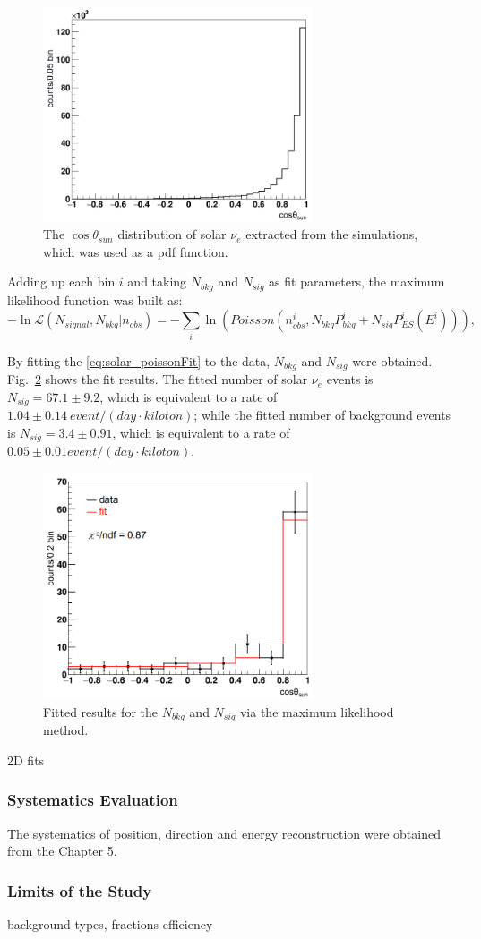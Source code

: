 \begin{figure}[!htb]
	\centering
	\includegraphics[width=8cm]{solarPDF.png}
	\caption{The $\cos\theta_{sun}$ distribution of solar $\nu_e$ extracted from the simulations, which was used as a pdf function.}
	\label{solarPDF}
\end{figure}

Adding up each bin $i$ and taking $N_{bkg}$ and $N_{sig}$ as fit parameters, the maximum likelihood function was built as:
\begin{equation}\label{eq:solar_poissonFit}
-\ln\mathcal L(N_{signal},N_{bkg}|n_{obs})
=-\sum_i\ln(Poisson(n^i_{obs}, N_{bkg}P^i_{bkg}+N_{sig}P^i_{ES}(E^i))),
\end{equation}

By fitting the \ref{eq:solar_poissonFit} to the data, $N_{bkg}$ and $N_{sig}$ were obtained.
Fig.~\ref{solarFits1} shows the fit results. The fitted number of solar $\nu_e$ events is $N_{sig} = 67.1\pm9.2$, which is equivalent to a rate of $1.04\pm 0.14~event/(day\cdot kiloton)$; while the fitted number of background events is $N_{sig} = 3.4\pm0.91$, which is equivalent to a rate of $0.05\pm 0.01 event/(day\cdot kiloton)$.

\begin{figure}[!htb]
	\centering
	\includegraphics[width=8cm]{solarFits1.png}
	\caption{Fitted results for the $N_{bkg}$ and $N_{sig}$ via the maximum likelihood method.}
	\label{solarFits1}
\end{figure}

2D fits



\subsubsection{Systematics Evaluation}
The systematics of position, direction and energy reconstruction were obtained from the Chapter 5.



\subsubsection{Limits of the Study}
background types, fractions
efficiency




